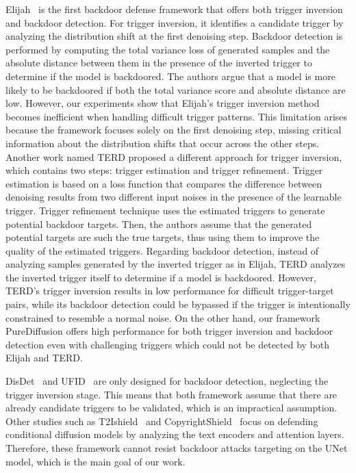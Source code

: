 Elijah~\cite{an2024elijah} is the first backdoor defense framework that offers both trigger inversion and backdoor detection. For trigger inversion, it identifies a candidate trigger by analyzing the distribution shift at the first denoising step. Backdoor detection is performed by computing the total variance loss of generated samples and the absolute distance between them in the presence of the inverted trigger to determine if the model is backdoored. The authors argue that a model is more likely to be backdoored if both the total variance score and absolute distance are low.
However, our experiments show that Elijah's trigger inversion method becomes inefficient when handling difficult trigger patterns. This limitation arises because the framework focuses solely on the first denoising step, missing critical information about the distribution shifts that occur across the other steps.
Another work named TERD\cite{mo2024terd} proposed a different approach for trigger inversion, which contains two steps: trigger estimation and trigger refinement. Trigger estimation is based on a loss function that compares the difference between denoising results from two different input noises in the presence of the learnable trigger. Trigger refinement technique uses the estimated triggers to generate potential backdoor targets. Then, the authors assume that the generated potential targets are such the true targets, thus using them to improve the quality of the estimated triggers. Regarding backdoor detection, instead of analyzing samples generated by the inverted trigger as in Elijah, TERD analyzes the inverted trigger itself to determine if a model is backdoored. However, TERD's trigger inversion results in low performance for difficult trigger-target pairs, while its backdoor detection could be bypassed if the trigger is intentionally constrained to resemble a normal noise\cite{li2023learnable}. On the other hand, our framework PureDiffusion offers high performance for both trigger inversion and backdoor detection even with challenging triggers which could not be detected by both Elijah and TERD. 

DisDet~\cite{sui2024disdet} and UFID~\cite{guan2024ufid} are only designed for backdoor detection, neglecting the trigger inversion stage. This means that both framework assume that there are already candidate triggers to be validated, which is an impractical assumption. Other studies such as T2Ishield~\cite{wang2025t2ishield} and CopyrightShield~\cite{guo2024copyrightshield} focus on defending conditional diffusion models by analyzing the text encoders and attention layers. Therefore, these framework cannot resist backdoor attacks targeting on the UNet model, which is the main goal of our work.

